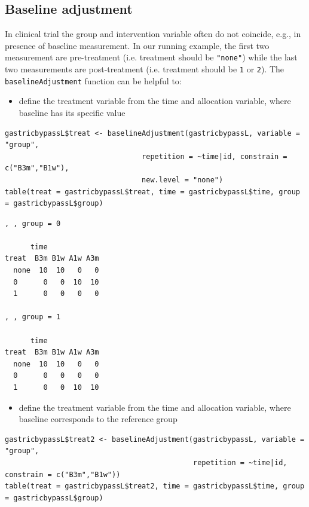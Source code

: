 \documentclass[12pt]{article}
\begin{document}
\clearpage

\subsection{Baseline adjustment}
\label{sec:org7c2402c}

In clinical trial the group and intervention variable often do not
coincide, e.g., in presence of baseline measurement. In our running
example, the first two measurement are pre-treatment (i.e. treatment
should be \texttt{"none"}) while the last two measurements are post-treatment
(i.e. treatment should be \texttt{1} or \texttt{2}). The \texttt{baselineAdjustment}
function can be helpful to:
\begin{itemize}
\item define the treatment variable from the time and allocation variable, where baseline has its specific value
\end{itemize}
\lstset{language=r,label= ,caption= ,captionpos=b,numbers=none}
\begin{lstlisting}
gastricbypassL$treat <- baselineAdjustment(gastricbypassL, variable = "group",
                                repetition = ~time|id, constrain = c("B3m","B1w"),
                                new.level = "none")
table(treat = gastricbypassL$treat, time = gastricbypassL$time, group = gastricbypassL$group)
\end{lstlisting}

\begin{verbatim}
, , group = 0

      time
treat  B3m B1w A1w A3m
  none  10  10   0   0
  0      0   0  10  10
  1      0   0   0   0

, , group = 1

      time
treat  B3m B1w A1w A3m
  none  10  10   0   0
  0      0   0   0   0
  1      0   0  10  10
\end{verbatim}

\begin{itemize}
\item define the treatment variable from the time and allocation variable,
where baseline corresponds to the reference group
\end{itemize}
\lstset{language=r,label= ,caption= ,captionpos=b,numbers=none}
\begin{lstlisting}
gastricbypassL$treat2 <- baselineAdjustment(gastricbypassL, variable = "group",
                                            repetition = ~time|id, constrain = c("B3m","B1w"))
table(treat = gastricbypassL$treat2, time = gastricbypassL$time, group = gastricbypassL$group)
\end{lstlisting}
\end{document}
